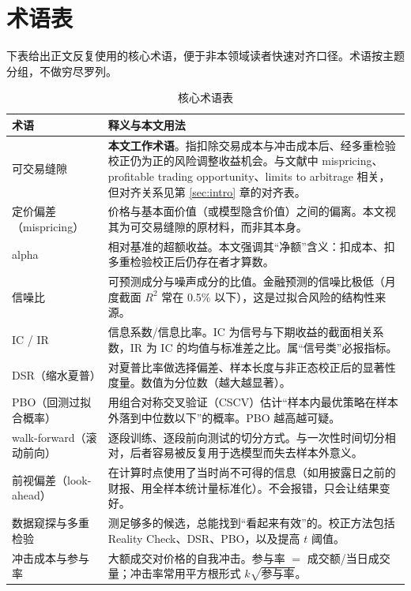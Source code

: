 \section{术语表}\label{sec:glossary}

下表给出正文反复使用的核心术语，便于非本领域读者快速对齐口径。术语按主题分组，不做穷尽罗列。

\begin{longtable}{@{}>{\raggedright\arraybackslash}p{3.6cm}>{\raggedright\arraybackslash}p{11.6cm}@{}}
\caption{核心术语表}\\
\toprule
术语 & 释义与本文用法 \\
\midrule
\endhead
可交易缝隙 & \textbf{本文工作术语}。指扣除交易成本与冲击成本后、经多重检验校正仍为正的风险调整收益机会。与文献中 mispricing、profitable trading opportunity、limits to arbitrage 相关，但对齐关系见第 \ref{sec:intro} 章的对齐表。 \\
\midrule
定价偏差（mispricing） & 价格与基本面价值（或模型隐含价值）之间的偏离。本文视其为可交易缝隙的原材料，而非其本身。 \\
\midrule
alpha & 相对基准的超额收益。本文强调其“净额”含义：扣成本、扣多重检验校正后仍存在者才算数。 \\
\midrule
信噪比 & 可预测成分与噪声成分的比值。金融预测的信噪比极低（月度截面 $R^2$ 常在 0.5\% 以下），这是过拟合风险的结构性来源。 \\
\midrule
IC / IR & 信息系数/信息比率。IC 为信号与下期收益的截面相关系数，IR 为 IC 的均值与标准差之比。属“信号类”必报指标。 \\
\midrule
DSR（缩水夏普） & 对夏普比率做选择偏差、样本长度与非正态校正后的显著性度量。数值为分位数（越大越显著）。 \\
\midrule
PBO（回测过拟合概率） & 用组合对称交叉验证（CSCV）估计“样本内最优策略在样本外落到中位数以下”的概率。PBO 越高越可疑。 \\
\midrule
walk-forward（滚动前向） & 逐段训练、逐段前向测试的切分方式。与一次性时间切分相对，后者容易被反复用于选模型而失去样本外意义。 \\
\midrule
前视偏差（look-ahead） & 在计算时点使用了当时尚不可得的信息（如用披露日之前的财报、用全样本统计量标准化）。不会报错，只会让结果变好。 \\
\midrule
数据窥探与多重检验 & 测足够多的候选，总能找到“看起来有效”的。校正方法包括 Reality Check、DSR、PBO，以及提高 $t$ 阈值。 \\
\midrule
冲击成本与参与率 & 大额成交对价格的自我冲击。参与率 $=$ 成交额/当日成交量；冲击率常用平方根形式 $k\sqrt{\text{参与率}}$。 \\

\end{longtable}

